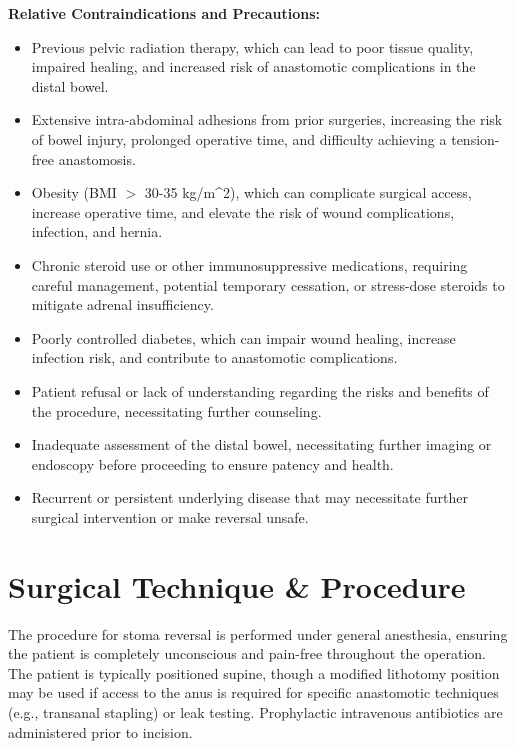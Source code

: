 \textbf{Relative Contraindications and Precautions:}
\begin{itemize}
  \item Previous pelvic radiation therapy, which can lead to poor tissue quality, impaired healing, and increased risk of anastomotic complications in the distal bowel.
  
  \item Extensive intra-abdominal adhesions from prior surgeries, increasing the risk of bowel injury, prolonged operative time, and difficulty achieving a tension-free anastomosis.
  
  \item Obesity (BMI $>$ 30-35 kg/m\textasciicircum2), which can complicate surgical access, increase operative time, and elevate the risk of wound complications, infection, and hernia.
  
  \item Chronic steroid use or other immunosuppressive medications, requiring careful management, potential temporary cessation, or stress-dose steroids to mitigate adrenal insufficiency.
  
  \item Poorly controlled diabetes, which can impair wound healing, increase infection risk, and contribute to anastomotic complications.
  
  \item Patient refusal or lack of understanding regarding the risks and benefits of the procedure, necessitating further counseling.
  
  \item Inadequate assessment of the distal bowel, necessitating further imaging or endoscopy before proceeding to ensure patency and health.
  
  \item Recurrent or persistent underlying disease that may necessitate further surgical intervention or make reversal unsafe.
\end{itemize}

\section*{Surgical Technique \& Procedure}
The procedure for stoma reversal is performed under general anesthesia, ensuring the patient is completely unconscious and pain-free throughout the operation. The patient is typically positioned supine, though a modified lithotomy position may be used if access to the anus is required for specific anastomotic techniques (e.g., transanal stapling) or leak testing. Prophylactic intravenous antibiotics are administered prior to incision.


